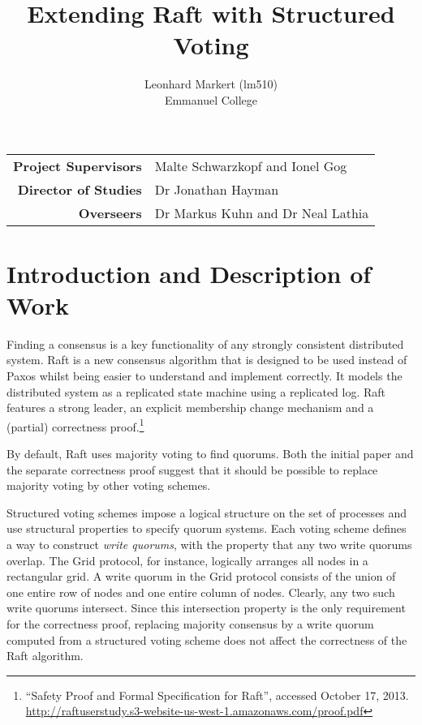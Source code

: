 \documentclass[12pt]{scrartcl}
\title{Extending Raft with Structured Voting}
\author{Leonhard Markert (lm510) \\ Emmanuel College}
\date{}
\begin{document}
\maketitle

\begin{center}
\begin{tabularx}{350pt}{rX}
\textbf{Project Supervisors} & Malte Schwarzkopf and Ionel Gog \\
\textbf{Director of Studies} & Dr Jonathan Hayman \\
\textbf{Overseers} & Dr Markus Kuhn and Dr Neal Lathia \\
\end{tabularx}
\end{center}

\newpage

\section{Introduction and Description of Work%
  \label{introduction-and-description-of-work}%
}

Finding a consensus is a key functionality of any strongly consistent distributed system. Raft \cite{raft} is a new consensus algorithm that is designed to be used instead of Paxos \cite{paxos} whilst being easier to understand and implement correctly. It models the distributed system as a replicated state machine using a replicated log. Raft features a strong leader, an explicit membership change mechanism and a (partial) correctness proof.\footnote{“Safety Proof and Formal Specification for Raft”, accessed October 17, 2013. \url{http://raftuserstudy.s3-website-us-west-1.amazonaws.com/proof.pdf}}

By default, Raft uses majority voting to find quorums. Both the initial paper and the separate correctness proof suggest that it should be possible to replace majority voting by other voting schemes.

Structured voting schemes \cite{voting} impose a logical structure on the set of processes and use structural properties to specify quorum systems. Each voting scheme defines a way to construct \emph{write quorums}, with the property that any two write quorums overlap. The Grid protocol, for instance, logically arranges all nodes in a rectangular grid. A write quorum in the Grid protocol consists of the union of one entire row of nodes and one entire column of nodes. Clearly, any two such write quorums intersect. Since this intersection property is the only requirement for the correctness proof, replacing majority consensus by a write quorum computed from a structured voting scheme does not affect the correctness of the Raft algorithm.
\end{document}
